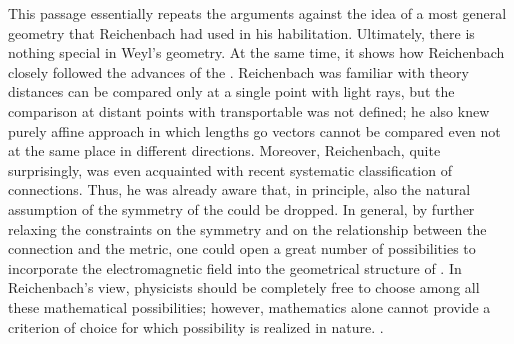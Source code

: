 \documentclass[draft]{article}
\newcommand{\WG}{Weyl's geometry\xspace}
\begin{document}
%
This passage essentially repeats the arguments against the idea of a most general geometry that Reichenbach had used in his habilitation. Ultimately, there is nothing special in \WG. At the same time, it shows how Reichenbach closely followed the advances of the \uftp. Reichenbach was familiar with   theory distances can be compared only at a single point with light rays, but the comparison at distant points with transportable \rac was not defined; he also knew  purely affine approach in which lengths go vectors cannot be compared even not at the same place in different directions. Moreover, Reichenbach, quite surprisingly, was even acquainted with  recent systematic classification of connections. Thus, he was already aware that, in principle, also the natural assumption of the symmetry of the \Gtmn could be dropped. In general, by further relaxing the constraints on the symmetry and on the relationship between the connection and the metric, one could open a great number of possibilities to incorporate the electromagnetic field into the geometrical structure of \spti. In Reichenbach's view, physicists should be completely free to choose among all these mathematical possibilities; however, mathematics alone cannot provide a criterion of choice for which possibility is realized in nature. .

\end{document}

